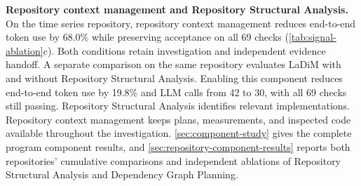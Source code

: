 \textbf{Repository context management and Repository Structural Analysis.} On the time series repository, repository context management reduces end-to-end token use by 68.0\% while preserving acceptance on all 69 checks (\cref{tab:signal-ablation}c). Both conditions retain investigation and independent evidence handoff. A separate comparison on the same repository evaluates LaDiM with and without Repository Structural Analysis. Enabling this component reduces end-to-end token use by 19.8\% and LLM calls from 42 to 30, with all 69 checks still passing. Repository Structural Analysis identifies relevant implementations. Repository context management keeps plans, measurements, and inspected code available throughout the investigation. \cref{sec:component-study} gives the complete program component results, and \cref{sec:repository-component-results} reports both repositories' cumulative comparisons and independent ablations of Repository Structural Analysis and Dependency Graph Planning.
